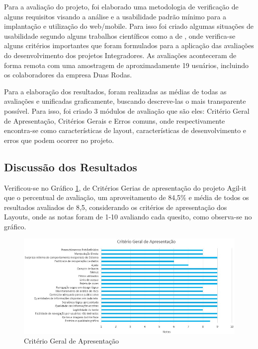 Para a avaliação do projeto, foi elaborado uma metodologia de verificação de alguns requisitos visando a análise e a usabilidade padrão mínimo para a implantação e utilização do web/mobile. Para isso foi criado algumas situações de usabilidade segundo alguns trabalhos científicos como a de \cite{silva2016principios}, onde verifica-se alguns critérios importantes que foram formulados para a aplicação das avaliações do desenvolvimento dos projetos Integradores. As avaliações aconteceram de forma remota com uma amostragem de aproximadamente 19 usuários, incluindo os colaboradores da empresa Duas Rodas.

Para a elaboração dos resultados, foram realizadas as médias de todas as avaliações e unificadas graficamente, buscando descreve-las o mais transparente possível. Para isso, foi criado 3 módulos de avaliação que são eles: Critério Geral de Apresentação, Critérios Gerais e Erros comuns, onde respectivamente encontra-se como características de layout, características de desenvolvimento e erros que podem ocorrer no projeto.

\subsection{Discussão dos Resultados}

Verificou-se no Gráfico \ref{criterio-geral-apresentacao}, de Critérios Gerias de apresentação do projeto Agil-it que o percentual de avaliação, um aproveitamento de 84,5\% e média de todos os resultados avaliados de 8,5, considerando os critérios de apresentação dos Layouts, onde as notas foram de 1-10 avaliando cada quesito, como observa-se no gráfico.

\begin{landscape}
\begin{figure}[H]
	\caption{\label{criterio-geral-apresentacao}Critério Geral de Apresentação}
	\begin{center}
		\includegraphics[scale=0.90]{./Figuras/cap-testes/criterio-geral-apresentacao.jpeg}
	\end{center}
\end{figure}
\end{landscape}

